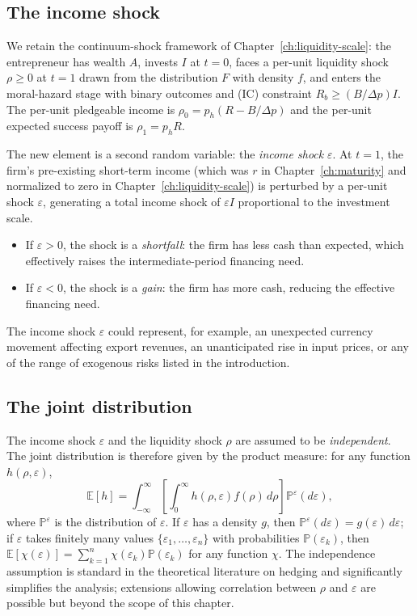 \documentclass[11pt,a4paper,oneside]{book}
\def\E{\mathbb{E}}
\def\geq{\geqslant}
\renewcommand{\P}{\mathbb{P}}
\theoremstyle{plain}
\theoremstyle{definition}
\theoremstyle{remark}
\numberwithin{equation}{chapter}
\begin{document}
\subsection{The income shock}

We retain the continuum-shock framework of Chapter~\ref{ch:liquidity-scale}: the entrepreneur has wealth $A$, invests $I$ at $t=0$, faces a per-unit liquidity shock $\rho \geq 0$ at $t=1$ drawn from the distribution $F$ with density $f$, and enters the moral-hazard stage with binary outcomes and (IC) constraint $R_b \geq (B/\Delta p) I$.
The per-unit pledgeable income is $\rho_0 = p_h(R - B/\Delta p)$ and the per-unit expected success payoff is $\rho_1 = p_h R$.

The new element is a second random variable: the \emph{income shock} $\varepsilon$.
At $t=1$, the firm's pre-existing short-term income (which was $r$ in Chapter~\ref{ch:maturity} and normalized to zero in Chapter~\ref{ch:liquidity-scale}) is perturbed by a per-unit shock $\varepsilon$, generating a total income shock of $\varepsilon I$ proportional to the investment scale.

\begin{itemize}
  \item If $\varepsilon > 0$, the shock is a \emph{shortfall}: the firm has less cash than expected, which effectively raises the intermediate-period financing need.
  \item If $\varepsilon < 0$, the shock is a \emph{gain}: the firm has more cash, reducing the effective financing need.
\end{itemize}
The income shock $\varepsilon$ could represent, for example, an unexpected currency movement affecting export revenues, an unanticipated rise in input prices, or any of the range of exogenous risks listed in the introduction.

\subsection{The joint distribution}

The income shock $\varepsilon$ and the liquidity shock $\rho$ are assumed to be \emph{independent}.
The joint distribution is therefore given by the product measure: for any function $h(\rho, \varepsilon)$,
\begin{equation}\label{eq:RM-joint-expectation}
  \E[h] = \int_{-\infty}^{\infty} \left[ \int_0^{\infty} h(\rho, \varepsilon) f(\rho) \, d\rho \right] \P^\varepsilon(d\varepsilon),
\end{equation}
where $\P^\varepsilon$ is the distribution of $\varepsilon$.
If $\varepsilon$ has a density $g$, then $\P^\varepsilon(d\varepsilon) = g(\varepsilon) \, d\varepsilon$; if $\varepsilon$ takes finitely many values $\{\varepsilon_1, \ldots, \varepsilon_n\}$ with probabilities $\P(\varepsilon_k)$, then $\E[\chi(\varepsilon)] = \sum_{k=1}^n \chi(\varepsilon_k) \P(\varepsilon_k)$ for any function $\chi$.
The independence assumption is standard in the theoretical literature on hedging and significantly simplifies the analysis; extensions allowing correlation between $\rho$ and $\varepsilon$ are possible but beyond the scope of this chapter.
\end{document}
